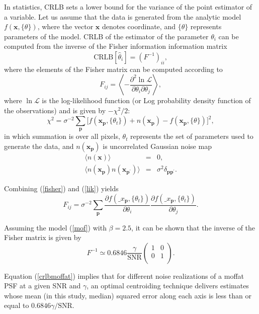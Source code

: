 \documentclass[12pt, preprint]{aastex}
\newcommand{\beq}{\begin{equation}}
\newcommand{\eeq}{\end{equation}}
\begin{document}
In statistics, CRLB sets a lower bound for the variance of the point estimator of a variable. Let us assume that the data is generated from the analytic model $f(\mathbf{x}, \{\theta\})$, where the vector $\mathbf{x}$ denotes coordinate, and $\{\theta\}$ represents parameters of the model. CRLB of the  estimator of the parameter $\theta_{i}$ can be computed from the inverse of the Fisher information information matrix  
\beq
\text{CRLB}[\hat{\theta}_{i}] = (F^{-1})_{ii}, 
\label{crlb}
\eeq
where the elements of the Fisher matrix can be computed according to
\beq
F_{ij} = \left \langle -\frac{\partial^{2} \ln \mathcal{L}}{\partial \theta_{i}\partial \theta_{j}} \right \rangle,   
\label{fisher}
\eeq
where $\ln \mathcal{L}$ is the log-likelihood function (or Log probability density function of the observations) and is given by $-\chi^{2}/2$: 
\beq
\chi^{2} = \sigma^{-2}\sum_{\mathbf{p}}\big [ f(\mathbf{x}_{\mathbf{p}},\{\theta_{t}\})+ n(\mathbf{x}_\mathbf{p}) - f(\mathbf{x}_{\mathbf{p}},\{\theta\}) \big ]^{2},
\label{lik}
\eeq
in which summation is over all pixels, ${\theta_{t}}$ represents the set of parameters used to generate the data, and $n(\mathbf{x}_{\mathbf{p}})$ is uncorrelated Gaussian noise map
\begin{eqnarray}
\langle n(\mathbf{x}) \rangle &=& 0, \\
\langle n(\mathbf{x_{p}})n(\mathbf{x_{p^{\prime}}}) \rangle &=& \sigma^{2}\delta_{\mathbf{p}\mathbf{p}^{\prime}}. 
\end{eqnarray}
  
Combining (\ref{fisher}) and (\ref{lik}) yields
\beq
F_{ij} = \sigma^{-2}\sum_{\mathbf{p}}\frac{\partial f(\mathbf_{x}_{\mathbf{p}} , \{\theta_{t}\})}{\partial \theta_{i}}\frac{\partial f(\mathbf_{x}_{\mathbf{p}} , \{\theta_{t}\})}{\partial \theta_{j}}.
\eeq 

Assuming the model (\ref{mof}) with $\beta = 2.5$, it can be shown that the inverse of the Fisher matrix is given by
\beq
  F^{-1} \simeq 0.6846 \frac{\gamma}{\text{SNR}} 
  \begin{pmatrix}
      1 & 0\\
      0 & 1\\
  \end{pmatrix}.
\label{crlbmoffat}
\eeq

Equation (\ref{crlbmoffat}) implies that for different noise realizations of a moffat PSF at a given SNR and $\gamma$, an optimal centroiding technique delivers estimates whose mean (in this study, median) squared error along each axis is less than or equal to $0.6846 \gamma/\text{SNR}$.
\end{document}
